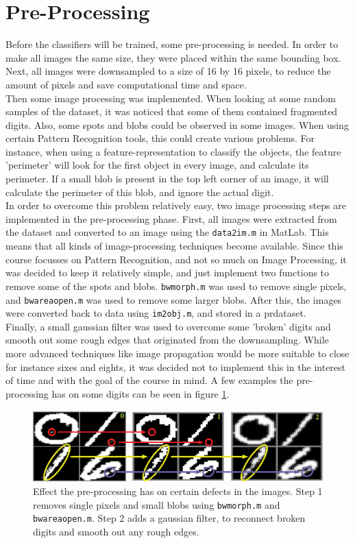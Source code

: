 \section{Pre-Processing}
\label{sec:ImPros}
Before the classifiers will be trained, some pre-processing is needed. In order to make all images the same size, they were placed within the same bounding box. Next, all images were downsampled to a size of 16 by 16 pixels, to reduce the amount of pixels and save computational time and space. \\
Then some image processing was implemented. When looking at some random samples of the dataset, it was noticed that some of them contained fragmented digits. Also, some spots and blobs could be observed in some images. When using certain Pattern Recognition tools, this could create various problems. For instance, when using a feature-representation to classify the objects, the feature 'perimeter' will look for the first object in every image, and calculate its perimeter. If a small blob is present in the top left corner of an image, it will calculate the perimeter of this blob, and ignore the actual digit. \\
In order to overcome this problem relatively easy, two image processing steps are implemented in the pre-processing phase. First, all images were extracted from the dataset and converted to an image using the \texttt{data2im.m} in MatLab. This means that all kinds of image-processing techniques become available. Since this course focusses on Pattern Recognition, and not so much on Image Processing, it was decided to keep it relatively simple, and just implement two functions to remove some of the spots and blobs. \texttt{bwmorph.m} was used to remove single pixels, and \texttt{bwareaopen.m} was used to remove some larger blobs. After this, the images were converted back to data using \texttt{im2obj.m}, and stored in a prdataset. \\
Finally, a small gaussian filter was used to overcome some 'broken' digits and smooth out some rough edges that originated from the downsampling. While more advanced techniques like image propagation would be more suitable to close for instance sixes and eights, it was decided not to implement this in the interest of time and with the goal of the course in mind. A few examples the pre-processing has on some digits can be seen in figure \ref{fig:Image_Prepros}.
\begin{figure}[H]
	\centering
	\includegraphics[scale=0.45]{images/Image_Prepros.jpg}
	\caption{Effect the pre-processing has on certain defects in the images. Step 1 removes single pixels and small blobs using \texttt{bwmorph.m} and \texttt{bwareaopen.m}. Step 2 adds a gaussian filter, to reconnect broken digits and smooth out any rough edges.}
	\label{fig:Image_Prepros}
\end{figure}